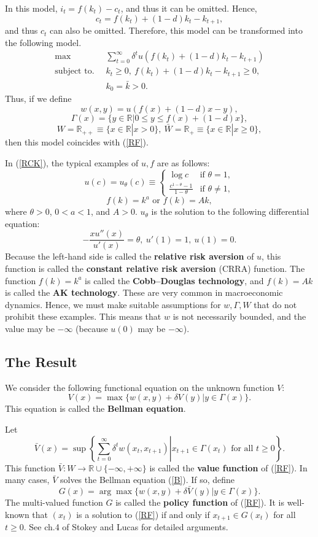 \documentclass[a4paper,12pt]{article}
\theoremstyle{definition}
\begin{document}
In this model, $i_t=f(k_t)-c_t$, and thus it can be omitted. Hence,
\[c_t=f(k_t)+(1-d)k_t-k_{t+1},\]
and thus $c_t$ can also be omitted. Therefore, this model can be transformed into the following model.
\begin{align*}
\max~~~~~&~\sum_{t=0}^{\infty}\delta^tu(f(k_t)+(1-d)k_t-k_{t+1})\\
\mbox{subject to. }&~k_t\ge 0,\ f(k_t)+(1-d)k_t-k_{t+1}\ge 0,\\
&~k_0=\bar{k}>0.
\end{align*}
Thus, if we define
\[w(x,y)=u(f(x)+(1-d)x-y),\]
\[\Gamma(x)=\{y\in \mathbb{R}|0\le y\le f(x)+(1-d)x\},\]
\[W=\mathbb{R}_{++}\equiv \{x\in \mathbb{R}|x>0\},\ \bar{W}=\mathbb{R}_+\equiv \{x\in \mathbb{R}|x\ge 0\},\]
then this model coincides with (\ref{RF}).

In (\ref{RCK}), the typical examples of $u,f$ are as follows:
\[u(c)=u_{\theta}(c)\equiv \begin{cases}
\log c & \mbox{if }\theta=1,\\
\frac{c^{1-\theta}-1}{1-\theta} & \mbox{if }\theta\neq 1,
\end{cases}\]
\[f(k)=k^a\mbox{ or }f(k)=Ak,\]
where $\theta>0$, $0<a<1$, and $A>0$. $u_{\theta}$ is the solution to the following differential equation:
\[-\frac{xu''(x)}{u'(x)}=\theta,\ u'(1)=1,\ u(1)=0.\]
Because the left-hand side is called the {\bf relative risk aversion} of $u$, this function is called the {\bf constant relative risk aversion} (CRRA) function. The function $f(k)=k^a$ is called the {\bf Cobb--Douglas technology}, and $f(k)=Ak$ is called the {\bf AK technology}. These are very common in macroeconomic dynamics. Hence, we must make suitable assumptions for $w,\Gamma,W$ that do not prohibit these examples. This means that $w$ is not necessarily bounded, and the value may be $-\infty$ (because $u(0)$ may be $-\infty$).


\subsection{The Result}
We consider the following functional equation on the unknown function $V$:
\begin{equation}\label{B}
V(x)=\max\{w(x,y)+\delta V(y)|y\in \Gamma(x)\}.
\end{equation}
This equation is called the {\bf Bellman equation}.

Let
\[\bar{V}(x)=\sup\left\{\left.\sum_{t=0}^{\infty}\delta^tw(x_t,x_{t+1})\right|x_{t+1}\in \Gamma(x_t)\mbox{ for all }t\ge 0\right\}.\]
This function $\bar{V}:W\to \mathbb{R}\cup\{-\infty,+\infty\}$ is called the {\bf value function} of (\ref{RF}). In many cases, $\bar{V}$ solves the Bellman equation (\ref{B}). If so, define
\[G(x)=\arg\max\{w(x,y)+\delta \bar{V}(y)|y\in \Gamma(x)\}.\]
The multi-valued function $G$ is called the {\bf policy function} of (\ref{RF}). It is well-known that $(x_t)$ is a solution to (\ref{RF}) if and only if $x_{t+1}\in G(x_t)$ for all $t\ge 0$. See ch.4 of Stokey and Lucas \cite{SL} for detailed arguments.
\end{document}
